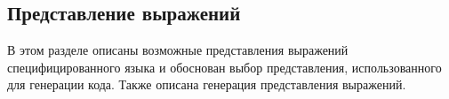 \subsection{Представление выражений}\label{term_repr}
В этом разделе описаны возможные представления выражений специфицированного языка и обоснован выбор представления, использованного для генерации кода. Также описана генерация представления выражений.







